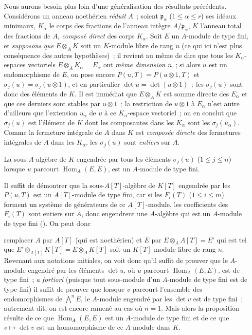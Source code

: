 \begin{remark}[6.4.7]
\label{II.6.4.7-fr}
Nous aurons besoin plus loin d'une généralisation des résultats précédents.
Considérons un anneau noethérien \emph{réduit} $A$~; soient
$\mathfrak{p}_\alpha$ ($1\leq\alpha\leq r$) ses idéaux minimaux, $K_\alpha$
le corps des fractions de l'anneau intègre $A/\mathfrak{p}_\alpha$, $K$
l'anneau total des fractions de $A$, \emph{composé direct} des corps
$K_\alpha$. Soit $E$ un $A$-module de type fini, et \emph{supposons que}
$E\otimes_AK$ soit un $K$-module libre de rang $n$ (ce qui ici n'est plus
conséquence des autres hypothèses)~; il revient au même de dire que tous les
$K_\alpha$-espaces vectoriels $E\otimes_AK_\alpha=E_\alpha$ ont \emph{même
dimension $n$}~; si alors $u$ est un endomorphisme de $E$, on pose encore
$P(u,T)=P(u\otimes1,T)$ et $\sigma_j(u)=\sigma_j(u\otimes1)$, et en
particulier $\det u=\det(u\otimes1)$~; les $\sigma_j(u)$ sont donc des
éléments de $K$. Il est immédiat que $E\otimes_AK$ est somme directe des
$E_\alpha$ et que ces derniers sont stables par $u\otimes1$~; la restriction
de $u\otimes1$ à $E_\alpha$ n'est autre d'ailleurs que l'extension $u_\alpha$
de $u$ à ce $K_\alpha$-espace vectoriel~; on en conclut que $\sigma_j(u)$ est
l'élément de $K$ dont les composantes dans les $K_\alpha$ sont les
$\sigma_j(u_\alpha)$. Comme la fermeture intégrale de $A$ dans $K$ est
\emph{composée directe} des fermetures intégrales de $A$ dans les
$K_\alpha$, les $\sigma_j(u)$ sont \emph{entiers} sur $A$.

\begin{lemma}[6.4.7.1]
\label{II.6.4.7.1-fr}
La sous-$A$-algèbre de $K$ engendrée par tous les éléments $\sigma_j(u)$
($1\leq j\leq n$) lorsque $u$ parcourt $\operatorname{Hom}_A(E,E)$, est un
$A$-module de type fini.
\end{lemma}

Il suffit de démontrer que la sous-$A[T]$-algèbre de $K[T]$ engendrée par les
$P(u,T)$ est un $A[T]$-module de type fini, car si les $F_i(T)$
($1\leq i\leq m$) forment un système de générateurs de ce $A[T]$-module, les
coefficients des $F_i(T)$ sont entiers sur $A$, donc engendrent une
$A$-algèbre qui est un $A$-module de type fini
(\cite[t.~I, p.~255, th.~1]{I-13}). On peut donc


remplacer $A$ par $A[T]$ (qui est noethérien) et $E$ par
$E\otimes_AA[T]=E'$ qui est tel que
$E'\otimes_{A[T]}K[T]=E\otimes_AK[T]$ soit un $K[T]$-module libre de rang $n$.
Revenant aux notations initiales, on voit donc qu'il suffit de prouver que le
$A$-module engendré par les éléments $\det u$, où $u$ parcourt
$\operatorname{Hom}_A(E,E)$, est de type fini~; \emph{a fortiori} (puisque
tout sous-module d'un $A$-module de type fini est de type fini) il suffit de
prouver que lorsque $v$ parcourt l'ensemble des endomorphismes de
$\bigwedge^nE$, le $A$-module engendré par les $\det v$ est de type fini~;
autrement dit, on est encore ramené au cas où $n=1$. Mais alors la proposition
résulte de ce que $\operatorname{Hom}_A(E,E)$ est un $A$-module de type fini
et de ce que $v\mapsto\det v$ est un homomorphisme de ce $A$-module dans $K$.


\end{remark}
